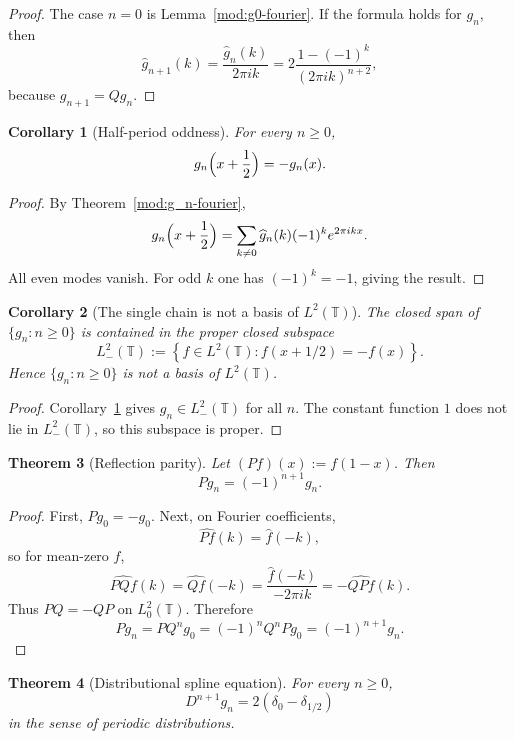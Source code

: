 \documentclass[11pt,a4paper]{article}
\numberwithin{equation}{section}
\newtheorem{theorem}{Theorem}[section]
\newtheorem{corollary}[theorem]{Corollary}
\theoremstyle{definition}
\theoremstyle{remark}
\begin{document}
\begin{proof}
The case $n=0$ is Lemma~\ref{mod:g0-fourier}.  If the formula holds for $g_n$, then
\[
\widehat g_{n+1}(k)=\frac{\widehat g_n(k)}{2\pi ik}
=
2\frac{1-(-1)^k}{(2\pi ik)^{n+2}},
\]
because $g_{n+1}=Qg_n$.
\end{proof}

\begin{corollary}[Half-period oddness]\label{mod:half-period-odd}
For every $n\ge 0$,
\[
g_n\Bigl(x+\frac12\Bigr)=-g_n(x).
\]
\end{corollary}

\begin{proof}
By Theorem~\ref{mod:g_n-fourier},
\[
g_n\Bigl(x+\frac12\Bigr)
=
\sum_{k\neq 0}\widehat g_n(k)(-1)^k e^{2\pi ikx}.
\]
All even modes vanish.  For odd $k$ one has $(-1)^k=-1$, giving the result.
\end{proof}

\begin{corollary}[The single chain is not a basis of $L^2(\mathbb T)$]\label{mod:not-basis}
The closed span of $\{g_n:n\ge 0\}$ is contained in the proper closed subspace
\[
L^2_-(\mathbb T):=
\left\{
f\in L^2(\mathbb T): f(x+1/2)=-f(x)
\right\}.
\]
Hence $\{g_n:n\ge 0\}$ is not a basis of $L^2(\mathbb T)$.
\end{corollary}

\begin{proof}
Corollary~\ref{mod:half-period-odd} gives $g_n\in L^2_-(\mathbb T)$ for all $n$.  The constant function $1$ does not lie in $L^2_-(\mathbb T)$, so this subspace is proper.
\end{proof}

\begin{theorem}[Reflection parity]\label{mod:reflection-parity}
Let $(Pf)(x):=f(1-x)$.  Then
\[
Pg_n=(-1)^{n+1}g_n.
\]
\end{theorem}

\begin{proof}
First, $Pg_0=-g_0$.  Next, on Fourier coefficients,
\[
\widehat{Pf}(k)=\widehat f(-k),
\]
so for mean-zero $f$,
\[
\widehat{PQf}(k)=\widehat{Qf}(-k)=\frac{\widehat f(-k)}{-2\pi ik}=-\widehat{QPf}(k).
\]
Thus $PQ=-QP$ on $L^2_0(\mathbb T)$.  Therefore
\[
Pg_n=P Q^n g_0 = (-1)^n Q^n P g_0 = (-1)^{n+1}g_n.
\]
\end{proof}

\begin{theorem}[Distributional spline equation]\label{mod:spline-equation}
For every $n\ge 0$,
\[
D^{n+1}g_n=2(\delta_0-\delta_{1/2})
\]
in the sense of periodic distributions.
\end{theorem}
\end{document}
